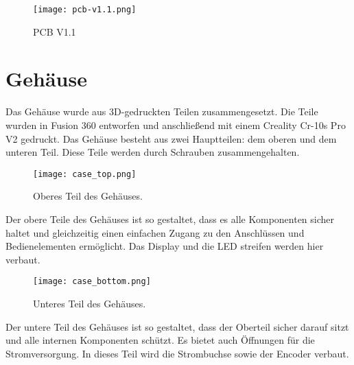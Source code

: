             \begin{figure}[h!]
                \centering
                \texttt{[image: pcb-v1.1.png]}
                \caption{PCB V1.1}
                \label{fig:pcb1.1}

            \end{figure}
            
        
    \newpage
    \section{Gehäuse}
    Das Gehäuse wurde aus 3D-gedruckten Teilen zusammengesetzt. Die Teile wurden in Fusion 360 
    entworfen und anschließend mit einem Creality Cr-10s Pro V2 gedruckt. Das Gehäuse besteht aus zwei 
    Hauptteilen: dem oberen und dem unteren Teil. Diese Teile werden durch Schrauben zusammengehalten.

        \begin{figure}[h!]
            \centering
            \texttt{[image: case\_top.png]}
            \caption{Oberes Teil des Gehäuses.}
            \label{fig:case_top}
        \end{figure}

    Der obere Teile des Gehäuses ist so gestaltet, dass es alle Komponenten sicher 
    haltet und gleichzeitig einen einfachen Zugang zu den Anschlüssen und Bedienelementen ermöglicht.
    Das Display und die LED streifen werden hier verbaut. 

        \begin{figure}[h!]
            \centering
            \texttt{[image: case\_bottom.png]}
            \caption{Unteres Teil des Gehäuses.}
            \label{fig:case_bottom}
        \end{figure}

    
    Der untere Teil des Gehäuses ist so gestaltet, dass der Oberteil sicher darauf sitzt und alle internen
    Komponenten schützt. Es bietet auch Öffnungen für die Stromversorgung. In dieses Teil wird
    die Strombuchse sowie der Encoder verbaut.
   


    